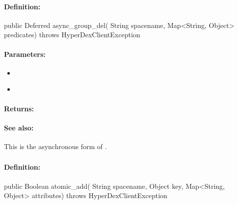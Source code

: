 \paragraph{Definition:}
\begin{javacode}
public Deferred async_group_del(
        String spacename,
        Map<String, Object> predicates) throws HyperDexClientException
\end{javacode}

\paragraph{Parameters:}
\begin{itemize}[noitemsep]
\item {}\\

\item {}\\

\end{itemize}

\paragraph{Returns:}


\paragraph{See also:}  This is the asynchronous form of .

\pagebreak
\subsubsection{}
\label{api:java:atomic_add}


\paragraph{Definition:}
\begin{javacode}
public Boolean atomic_add(
        String spacename,
        Object key,
        Map<String, Object> attributes) throws HyperDexClientException
\end{javacode}

